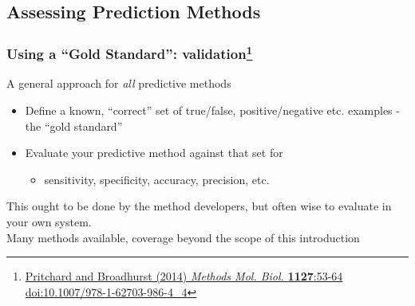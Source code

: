 
\subsection{Assessing Prediction Methods}

\begin{frame}
  \frametitle{Using a ``Gold Standard'': validation\footnote{\tiny{\href{http://dx.doi.org/10.1007/978-1-62703-986-4_4}{Pritchard and Broadhurst (2014) \textit{Methods Mol. Biol.} \textbf{1127}:53-64 doi:10.1007/978-1-62703-986-4\_4}}}}
  A general approach for \emph{all} predictive methods
  \begin{itemize}
    \item Define a known, ``correct'' set of true/false, positive/negative etc. examples - the ``gold standard''
    \item Evaluate your predictive method against that set for
    \begin{itemize}
      \item sensitivity, specificity, accuracy, precision, etc.
    \end{itemize}
  \end{itemize}
  This ought to be done by the method developers, but often wise to evaluate in your own system.\\[0.1cm]
  Many methods available, coverage beyond the scope of this introduction
\end{frame}


